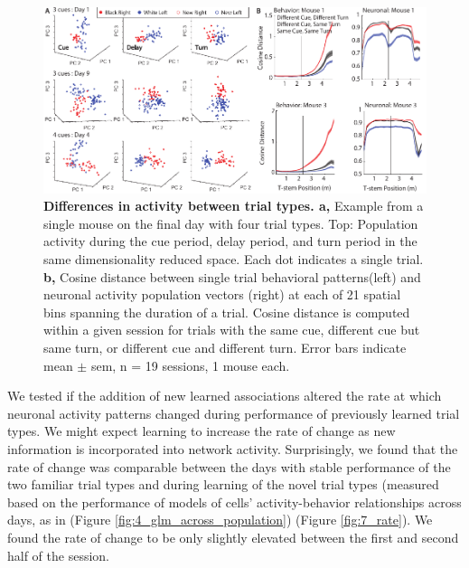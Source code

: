 \begin{figure}
\includegraphics[width=\textwidth]{figures/7_pca_all.pdf}
\caption[Differences in activity between trial types.]{\textbf{Differences in activity between trial types. a,} Example from a single mouse on the final day with four trial types. Top: Population activity during the cue period, delay period, and turn period in the same dimensionality reduced space. Each dot indicates a single trial. 
%
\textbf{b,} Cosine distance between single trial behavioral patterns(left) and neuronal activity population vectors (right) at each of 21 spatial bins spanning the duration of a trial. Cosine distance is computed within a given session for trials with the same cue, different cue but same turn, or different cue and different turn. Error bars indicate mean $\pm$ sem, n = 19 sessions, 1 mouse each.
\label{fig:7_pca_all}}
\end{figure}

We tested if the addition of new learned associations altered the rate at which neuronal activity patterns changed during performance of previously learned trial types. We might expect learning to increase the rate of change as new information is incorporated into network activity. Surprisingly, we found that the rate of change was comparable between the days with stable performance of the two familiar trial types and during learning of the novel trial types (measured based on the performance of models of cells' activity-behavior relationships across days, as in (Figure  \ref{fig:4_glm_across_population}) (Figure \ref{fig:7_rate}). We found the rate of change to be only slightly elevated between the first and second half of the session.

